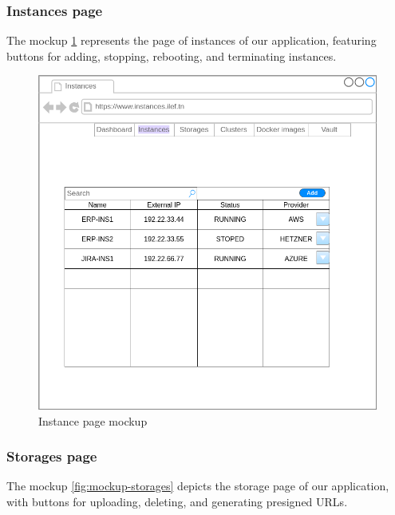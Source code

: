 \subsubsection{Instances page}

The mockup \hyperref[fig:mockup-instances]{\ref{fig:mockup-instances}} represents the page of instances of our application, featuring buttons for adding, stopping, rebooting, and terminating instances.

\begin{figure}[h]
  \center
  \includegraphics[width=13cm]{mockup-instances.png}
  \caption{Instance page mockup}
  \label{fig:mockup-instances}
\end{figure}

\subsubsection{Storages page}

The mockup \hyperref[fig:mockup-storages]{\ref{fig:mockup-storages}} depicts the storage page of our application, with buttons for uploading, deleting, and generating presigned URLs.

